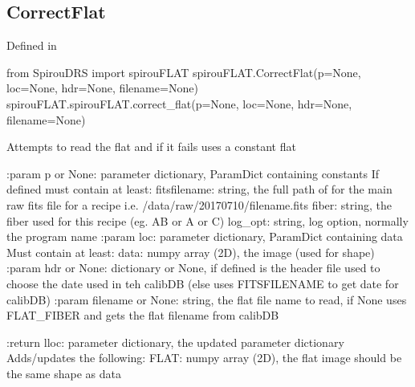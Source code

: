 \noindent\begin{minipage}{\textwidth}
\subsection{CorrectFlat}

Defined in \spirouFLAT{}

\begin{pythonbox}
from SpirouDRS import spirouFLAT
spirouFLAT.CorrectFlat(p=None, loc=None, hdr=None, filename=None)
spirouFLAT.spirouFLAT.correct_flat(p=None, loc=None, hdr=None, filename=None)
\end{pythonbox}

\begin{pythondocstring}
    Attempts to read the flat and if it fails uses a constant flat

    :param p or None: parameter dictionary, ParamDict containing constants
        If defined must contain at least:
            fitsfilename: string, the full path of for the main raw fits
                          file for a recipe
                          i.e. /data/raw/20170710/filename.fits
            fiber: string, the fiber used for this recipe (eg. AB or A or C)
            log_opt: string, log option, normally the program name
    :param loc: parameter dictionary, ParamDict containing data
        Must contain at least:
            data: numpy array (2D), the image (used for shape)
    :param hdr or None: dictionary or None, if defined is the header file used
                        to choose the date used in teh calibDB (else uses
                        FITSFILENAME to get date for calibDB)
    :param filename or None: string, the flat file name to read, if None
                             uses FLAT_{FIBER} and gets the flat filename from
                             calibDB

    :return lloc: parameter dictionary, the updated parameter dictionary
            Adds/updates the following:
                FLAT: numpy array (2D), the flat image should be the same
                      shape as data
\end{pythondocstring}
\end{minipage}




